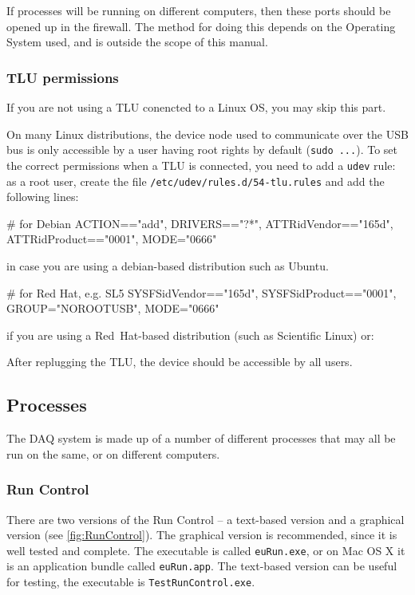 If processes will be running on different computers,
then these ports should be opened up in the firewall.
The method for doing this depends on the Operating System used,
and is outside the scope of this manual.


\subsubsection{TLU permissions}\label{sec:TLUperm}
If you are not using a TLU conencted to a Linux OS, you may skip this part.

On many Linux distributions, the device node used to communicate over the USB bus is only
accessible by a user having root rights by default (\texttt{sudo ...}).
To set the correct permissions when a \gls{TLU} is
connected, you need to add a \texttt{udev} rule: as a root user, 
create the file \texttt{/etc/udev/rules.d/54-tlu.rules} and add
the following lines:
\begin{listing}
# for Debian
ACTION=="add", DRIVERS=="?*",  ATTR{idVendor}=="165d", ATTR{idProduct}=="0001",  MODE="0666"
\end{listing}
in case you are using a debian-based distribution such as Ubuntu.
\begin{listing}
# for Red Hat, e.g. SL5
SYSFS{idVendor}=="165d", SYSFS{idProduct}=="0001", GROUP="NOROOTUSB", MODE="0666"
\end{listing}
if you are using a Red~Hat-based distribution (such as Scientific Linux) or:

After replugging the \gls{TLU}, the device should be accessible by
all users.

\subsection{Processes}
The DAQ system is made up of a number of different processes that may all be run on the same,
or on different computers. 

\subsubsection{Run Control}
\label{sec:runcontrol}
There are two versions of the Run Control -- a text-based version and a graphical version (see \autoref{fig:RunControl}).
The graphical version is recommended, since it is well tested and complete.
The executable is called \texttt{euRun.exe}, or on Mac OS X it is an application bundle called \texttt{euRun.app}.
The text-based version can be useful for testing, the executable is \texttt{TestRunControl.exe}.

